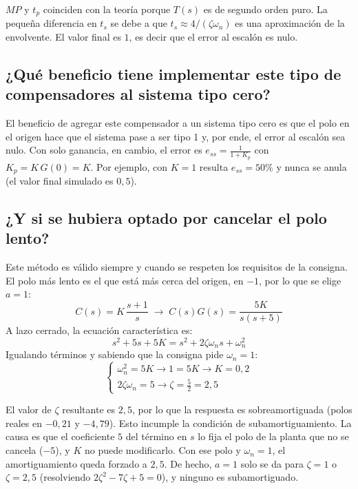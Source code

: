 \documentclass[10pt]{article}
\begin{document}
$MP$ y $t_p$ coinciden con la teoría porque $T(s)$ es de segundo orden puro. La pequeña diferencia en $t_s$ se debe a que $t_s \approx 4/(\zeta\omega_n)$ es una aproximación de la envolvente. El valor final es $1$, es decir que el error al escalón es nulo.

\subsection*{¿Qué beneficio tiene implementar este tipo de compensadores al sistema tipo cero?}

El beneficio de agregar este compensador a un sistema tipo cero es que el polo en el origen hace que el sistema pase a ser tipo 1 y, por ende, el error al escalón sea nulo.
Con solo ganancia, en cambio, el error es $e_{ss} = \frac{1}{1+K_p}$ con $K_p = K\,G(0) = K$. 
Por ejemplo, con $K = 1$ resulta $e_{ss} = 50\%$ y nunca se anula (el valor final simulado es $0{,}5$).

\subsection*{¿Y si se hubiera optado por cancelar el polo lento?}

Este método es válido siempre y cuando se respeten los requisitos de la consigna. El polo más lento es el que está más cerca del origen, en $-1$, por lo que se elige $a = 1$:
\[
C(s) = K\,\frac{s+1}{s} \;\rightarrow\; C(s)G(s) = \frac{5K}{s(s+5)}
\]
A lazo cerrado, la ecuación característica es:
\[
s^2 + 5s + 5K = s^2 + 2\zeta\omega_n s + \omega_n^2
\]
Igualando términos y sabiendo que la consigna pide $\omega_n = 1$:
\begin{equation}
\begin{cases}
\omega_n^2 = 5K \rightarrow 1 = 5K \rightarrow K = 0{,}2 \\
2\zeta\omega_n = 5 \rightarrow \zeta = \frac{5}{2} = 2{,}5
\end{cases}
\end{equation}

El valor de $\zeta$ resultante es $2{,}5$, por lo que la respuesta es sobreamortiguada (polos reales en $-0{,}21$ y $-4{,}79$). 
Esto incumple la condición de subamortiguamiento. La causa es que el coeficiente $5$ del término en $s$ lo fija el polo de la planta que no se cancela ($-5$), y $K$ no puede modificarlo. 
Con ese polo y $\omega_n = 1$, el amortiguamiento queda forzado a $2{,}5$. De hecho, $a = 1$ solo se da para $\zeta = 1$ o $\zeta = 2{,}5$ (resolviendo $2\zeta^2 - 7\zeta + 5 = 0$), y ninguno es subamortiguado.
\end{document}
